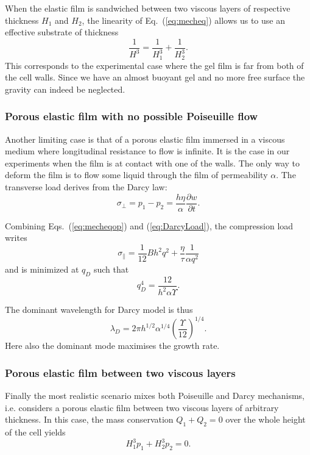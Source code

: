 \documentclass[twocolumn,superscriptaddress,showpacs,preprintnumbers,
amsmath,amssymb,prl]{revtex4-1}
\begin{document}
When the elastic film is sandwiched between two viscous layers of respective thickness $H_1$ and $H_2$, the linearity of Eq.~(\ref{eq:mecheq}) allows us to use an effective substrate of thickness 
\begin{equation}
\frac{1}{H^3} = \frac{1}{H_1^3}+\frac{1}{H_2^3}.
\end{equation}
This corresponds to the experimental case where the gel film is far from both of the cell walls. Since we have an almost buoyant gel and no more free surface the gravity can indeed be neglected.

\subsubsection*{Porous elastic film with no possible Poiseuille flow}
Another limiting case is that of a porous elastic film immersed in a viscous medium where longitudinal resistance to flow is infinite. It is the case in our experiments when the film is at contact with one of the walls. The only way to deform the film is to flow some liquid through the film of permeability $\alpha$. The transverse load derives from the Darcy law:
\begin{equation}
\sigma_\perp = p_1-p_2 = \frac{h\eta}{\alpha}\frac{\partial w}{\partial t}.
\label{eq:DarcyLoad}
\end{equation}

Combining Eqs.~(\ref{eq:mecheqop}) and (\ref{eq:DarcyLoad}), the compression load writes
\begin{equation}
\sigma_\parallel = \frac{1}{12}B h^2 q^2 + \frac{\eta}{\tau}\frac{1}{\alpha q^2}
\label{eq:sigma0D}
\end{equation}
and is minimized at $q_D$ such that
\begin{equation}
q_D^4 = \frac{12}{h^2\alpha\Upsilon}.
\label{eq:qD}
\end{equation}

The dominant wavelength for Darcy model is thus
\begin{equation}
\lambda_D = 2\pi h^{1/2}\alpha^{1/4}\left(\frac{\Upsilon}{12}\right)^{1/4}.
\end{equation}
Here also the dominant mode maximises the growth rate.


\subsubsection*{Porous elastic film between two viscous layers}
Finally the most realistic scenario mixes both Poiseuille and Darcy mechanisms, i.e. considers a porous elastic film between two viscous layers of arbitrary thickness. In this case, the mass conservation $Q_1 + Q_2 = 0$ over the whole height of the cell yields
\begin{equation}
H_1^3 p_1 + H_2^3 p_2 = 0.
\label{eq:pressures}
\end{equation}
\end{document}
